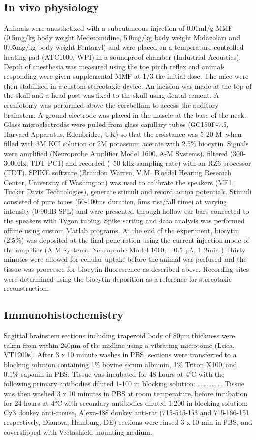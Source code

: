 \documentclass{article}
\begin{document}
\subsection{In vivo physiology}
Animals were anesthetized with a subcutaneous injection of 0.01ml/g MMF (0.5mg/kg body weight Medetomidine, 5.0mg/kg body weight Midazolam and 0.05mg/kg body weight Fentanyl) and were placed on a temperature controlled heating pad (ATC1000, WPI) in a soundproof chamber (Industrial Acoustics). Depth of anesthesia was measured using the toe pinch reflex and animals responding were given supplemental MMF at 1/3 the initial dose. The mice were then stabilized in a custom stereotaxic device. An incision was made at the top of the skull and a head post was fixed to the skull using dental cement. A craniotomy was performed above the cerebellum to access the auditory brainstem. A ground electrode was placed in the muscle at the base of the neck. Glass microelectrodes were pulled from glass capillary tubes (GC150F-7.5, Harvard Apparatus, Edenbridge, UK) so that the resistance was 5-20 M when filled with 3M KCl solution or 2M potassium acetate with 2.5\% biocytin. Signals were amplified (Neuroprobe Amplifier Model 1600, A-M Systems), filtered (300-3000Hz; TDT PC1) and recorded (~50 kHz sampling rate) with an RZ6 processor (TDT). SPIKE software (Brandon Warren, V.M. Bloedel Hearing Research Center, University of Washington) was used to calibrate the speakers (MF1, Tucker Davis Technologies), generate stimuli and record action potentials. Stimuli consisted of pure tones (50-100ms duration, 5ms rise/fall time) at varying intensity (0-90dB SPL) and were presented through hollow ear bars connected to the speakers with Tygon tubing. Spike sorting and data analysis was performed offline using custom Matlab programs. At the end of the experiment, biocytin (2.5\%) was deposited at the final penetration using the current injection mode of the amplifier (A-M Systems, Neuroprobe Model 1600; +0.5 µA, 1-2min.) Thirty minutes were allowed for cellular uptake before the animal was perfused and the tissue was processed for biocytin fluorescence as described above. Recording sites were determined using the biocytin deposition as a reference for stereotaxic reconstruction. 
\subsection{Immunohistochemistry}
Sagittal brainstem sections including trapezoid body of 80µm thickness were taken from within 240µm of the midline using a vibrating microtome (Leica, VT1200s). After 3 x 10 minute washes in PBS, sections were transferred to a blocking solution containing 1\% bovine serum albumin, 1\% Triton X100, and 0.1\% saponin in PBS. Tissue was incubated for 48 hours at 4°C with the following primary antibodies diluted 1-100 in blocking solution: ……………. Tissue was then washed 3 x 10 minutes in PBS at room temperature, before incubation for 24 hours at 4°C with secondary antibodies diluted 1:200 in blocking solution: Cy3 donkey anti-mouse, Alexa-488 donkey anti-rat (715-545-153 and 715-166-151 respectively, Dianova, Hamburg, DE) sections were rinsed 3 x 10 min in PBS, and coverslipped with Vectashield mounting medium.
\end{document}
